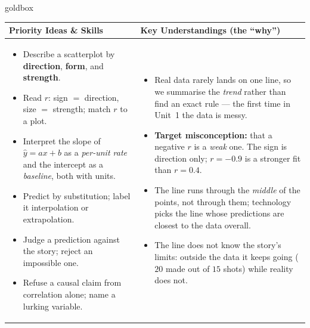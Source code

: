 \documentclass[10pt]{article}
\begin{document}
\renewcommand{\arraystretch}{1.4}
\begin{skillbox}{goldbox}
\begin{tabularx}{\linewidth}{@{}X|X@{}}
\textbf{Priority Ideas \& Skills} & \textbf{Key Understandings (the ``why'')} \\[2pt]
\hline
\vspace{-6pt}
\begin{itemize}[leftmargin=1.1em, nosep, after=\vspace{2pt}]
  \item Describe a scatterplot by \textbf{direction}, \textbf{form}, and \textbf{strength}.
  \item Read $r$: sign $=$ direction, size $=$ strength; match $r$ to a plot.
  \item Interpret the slope of $\hat y=ax+b$ as a \emph{per-unit rate} and the intercept as a
        \emph{baseline}, both with units.
  \item Predict by substitution; label it interpolation or extrapolation.
  \item Judge a prediction against the story; reject an impossible one.
  \item Refuse a causal claim from correlation alone; name a lurking variable.
\end{itemize}
&
\vspace{-6pt}
\begin{itemize}[leftmargin=1.1em, nosep, after=\vspace{2pt}]
  \item Real data rarely lands on one line, so we summarise the \emph{trend} rather than find an
        exact rule --- the first time in Unit~1 the data is messy.
  \item \textbf{Target misconception:} that a negative $r$ is a \emph{weak} one. The sign is
        direction only; $r=-0.9$ is a stronger fit than $r=0.4$.
  \item The line runs through the \emph{middle} of the points, not through them; technology
        picks the line whose predictions are closest to the data overall.
  \item The line does not know the story's limits: outside the data it keeps going ($20$ made out
        of $15$ shots) while reality does not.
\end{itemize}
\end{tabularx}
\end{skillbox}
\end{document}
